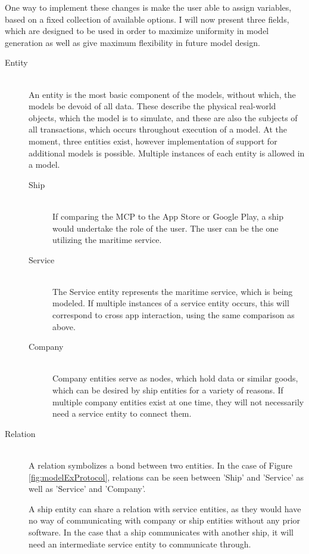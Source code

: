 One way to implement these changes is make the user able to assign variables, based on a fixed collection of available options. I will now present three fields, which are designed to be used in order to maximize uniformity in model generation as well as give maximum flexibility in future model design.
\begin{description}
	\item[Entity]\ \\
	An entity is the most basic component of the models, without which, the models be devoid of all data. These describe the physical real-world objects, which the model is to simulate, and these are also the subjects of all transactions, which occurs throughout execution of a model. At the moment, three entities exist, however implementation of support for additional models is possible.
	Multiple instances of each entity is allowed in a model.
	\begin{description}
		\item[Ship]\ \\
			If comparing the MCP to the App Store or Google Play, a ship would undertake the role of the user. The user can be the one utilizing the maritime service.
		\item[Service]\ \\
			The Service entity represents the maritime service, which is being modeled. If multiple instances of a service entity occurs, this will correspond to cross app interaction, using the same comparison as above.
		\item[Company]\ \\
			Company entities serve as nodes, which hold data or similar goods, which can be desired by ship entities for a variety of reasons. If multiple company entities exist at one time, they will not necessarily need a service entity to connect them. 
	\end{description}
	\item[Relation]\ \\
		A relation symbolizes a bond between two entities. In the case of Figure \ref{fig:modelExProtocol}, relations can be seen between 'Ship' and 'Service' as well as 'Service' and 'Company'.

		A ship entity can share a relation with service entities, as they would have no way of communicating with company or ship entities without any prior software. In the case that a ship communicates with another ship, it will need an intermediate service entity to communicate through.


\end{description}
